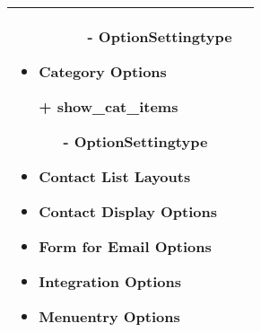 \begin{minipage}{0.7\textwidth}
\begin{tabular}{|p{} | p{}|}
\begin{itemize}
\begin{enumerate}
\begin{enumerate}
	    			 \item[-] OptionSettingtype
	    	\end{enumerate}
	   \end{enumerate}
   	\item Category Options
   	\item[+] show\_cat\_items
   		    	  \begin{enumerate}
   		    			 \item[-] OptionSettingtype
   		    	\end{enumerate}
   	\item Contact List Layouts
	\item Contact Display Options
	\item Form for Email Options
	\item Integration Options
	\item Menuentry Options
 \end{itemize}
\\
\hline
\end{tabular}
\end{minipage}

